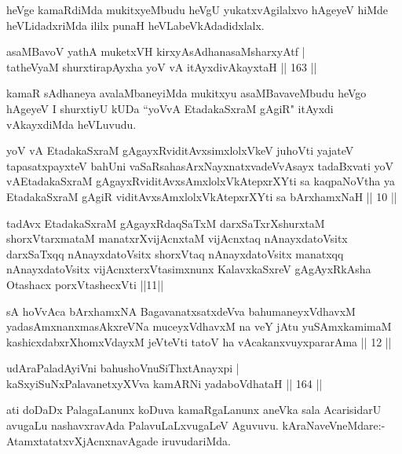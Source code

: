 \begin{artha}%
heVge kamaRdiMda mukitxyeMbudu heVgU yukatxvAgilalxvo hAgeyeV hiMde heVLidadxriMda ililx punaH heVLabeVkAdadidxlalx.
\end{artha}

\begin{shl}
asaMBavoV yathA muketxVH kirxyAsAdhanasaMsharxyAtf |\\
tatheVyaM shurxtirapAyxha yoV vA itAyxdivAkayxtaH \hfill || 163 ||
\end{shl}

\begin{artha}
kamaR sAdhaneya avalaMbaneyiMda mukitxyu asaMBavaveMbudu heVgo hAgeyeV I shurxtiyU kUDa ``yoVvA EtadakaSxraM gAgiR" itAyxdi vAkayxdiMda heVLuvudu.
\end{artha}



\begin{kandikeshl}
yoV vA EtadakaSxraM gAgayxRviditAvxsimxlolxVkeV juhoVti yajateV tapasatxpayxteV bahUni vaSaRsahasArxNayxnatxvadeVvAsayx tadaBxvati yoV vA\break EtadakaSxraM gAgayxRviditAvxsAmxlolxVkAtepxrXYti sa kaqpaNoV\s tha ya EtadakaSxraM gAgiR viditAvxsAmxlolxVkAtepxrXYti sa bArxhamxNaH || 10 ||

tadAvx EtadakaSxraM gAgayxRdaqSaTxM darxSaTxrXshurxtaM shorxVtarxmataM manatxrXvijAcnxtaM vijAcnxtaq nAnayxdatoV\s sitx darxSaTxqq nAnayxdatoV\s sitx shorxVtaq nAnayxdatoV\s sitx manatxqq nAnayxdatoV\s sitx vijAcnxterxVtasimxnunx KalavxkaSxreV gAgAyxRkAsha Otashacx porxVtashecxVti ||11||

sA hoVvAca bArxhamxNA BagavanatxsatxdeVva bahumaneyxVdhavxM yadasAmxnanxmasAkxreVNa muceyxVdhavxM na veY jAtu yuSAmxkamimaM kashicxdabxrXhomxVdayxM jeVteVti tatoV ha vAcakanxvuyxpararAma || 12 ||
\end{kandikeshl}


\begin{shl}
udAraPaladAyiVni bahushoV\s nuSiThxtAnayxpi |\\
kaSxyiSuNxPalavanetxyXVva kamARNi yadaboVdhataH \hfill || 164 ||
\end{shl}

\begin{artha}
ati doDaDx PalagaLanunx koDuva kamaRgaLanunx aneVka sala AcarisidarU avugaLu nashavxravAda PalavuLaLxvugaLeV Aguvuvu. kAraNaveVneMdare:- AtamxtatatxvXjAcnxnavAgade iruvudariMda.
\end{artha}

